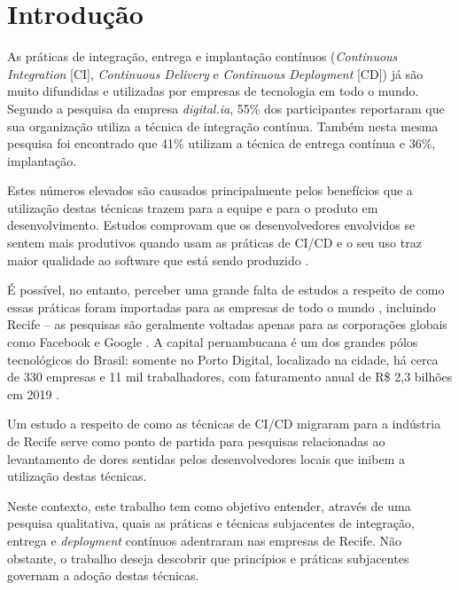 
\section{Introdução}

As práticas de integração, entrega e implantação contínuos \cite{fowlerCI, fowlerCD} (\emph{Continuous Integration} [CI], \emph{Continuous Delivery} e \emph{Continuous Deployment} [CD]) já são muito difundidas e utilizadas por empresas de tecnologia em todo o mundo. Segundo a pesquisa da empresa \emph{digital.ia}\cite{stateAgileReport2020}, 55\% dos participantes reportaram que sua organização utiliza a técnica de integração contínua. Também nesta mesma pesquisa foi encontrado que 41\% utilizam a técnica de entrega contínua e 36\%, implantação.

Estes números elevados são causados principalmente pelos benefícios que a utilização destas técnicas trazem para a equipe e para o produto em desenvolvimento. Estudos comprovam que os desenvolvedores envolvidos se sentem mais produtivos quando usam as práticas de CI/CD \cite{hilton2016} e o seu uso traz maior qualidade ao software que está sendo produzido \cite{savor2015}. 

É possível, no entanto, perceber uma grande falta de estudos a respeito de como essas práticas foram importadas para as empresas de todo o mundo \cite{empiricalStudy2016}, incluindo Recife -- as pesquisas são geralmente voltadas apenas para as corporações globais como Facebook \cite{savor2015} e Google \cite{googleCi}. A capital pernambucana é um dos grandes pólos tecnológicos do Brasil: somente no Porto Digital, localizado na cidade, há cerca de 330 empresas e 11 mil trabalhadores, com faturamento anual de R\$ 2,3 bilhões em 2019 \cite{portoDigital}.

Um estudo a respeito de como as técnicas de CI/CD migraram para a indústria de Recife serve como ponto de partida para pesquisas relacionadas ao levantamento de dores sentidas pelos desenvolvedores locais que inibem a utilização destas técnicas.

Neste contexto, este trabalho tem como objetivo entender, através de uma pesquisa qualitativa, quais as práticas e técnicas subjacentes de integração, entrega e \emph{deployment} contínuos adentraram nas empresas de Recife. Não obstante, o trabalho deseja descobrir que princípios e práticas subjacentes governam a adoção destas técnicas.


